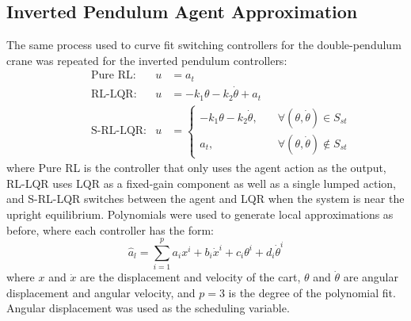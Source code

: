 \subsection{Inverted Pendulum Agent Approximation}
The same process used to curve fit switching controllers for the double-pendulum crane was repeated for the inverted pendulum controllers:
%
\begin{align*}
&\qquad\qquad\text{Pure RL:} & u&=a_t \qquad\\
&\qquad\qquad\text{RL-LQR:} & u&= -k_1\theta - k_2\dot{\theta} + a_t \qquad\\
%
&\qquad\qquad\text{S-RL-LQR:} & u&= 
\left\{
    \begin{array}{cl}
        -k_1\theta - k_2\dot{\theta}, & \quad \forall (\theta, \dot{\theta}) \in S_{st}\\
        a_t, & \quad \forall(\theta,\dot{\theta})\notin S_{st}
    \end{array}
    \right. \qquad
\end{align*}
%
where Pure RL is the controller that only uses the agent action as the output, RL-LQR uses LQR as a fixed-gain component as well as a single lumped action, and S-RL-LQR switches between the agent and LQR when the system is near the upright equilibrium.
Polynomials were used to generate local approximations as before, where each controller has the form:
%
\begin{equation}
\hat{a}_l=\sum_{i=1}^p a_ix^i + b_i\dot{x}^i + c_i\theta^i + d_i\dot{\theta}^i
\label{eq_chap5:inv_pend_unsat_approx_func}
\end{equation}
%
where $x$ and $\dot{x}$ are the displacement and velocity of the cart, $\theta$ and $\dot{\theta}$ are angular displacement and angular velocity, and $p=3$ is the degree of the polynomial fit. Angular displacement was used as the scheduling variable.

